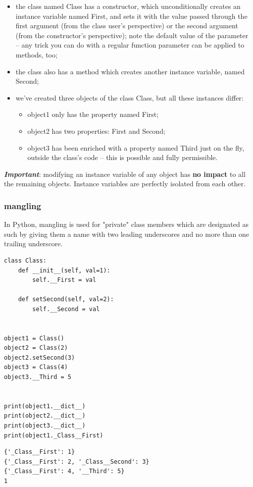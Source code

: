 \documentclass[11pt]{article}
\begin{document}
\begin{itemize}
\item the class named Class has a constructor, which unconditionally
creates an instance variable named First, and sets it with the value
passed through the first argument (from the class user’s
perspective) or the second argument (from the constructor’s
perspective); note the default value of the parameter – any trick
you can do with a regular function parameter can be applied to
methods, too;
\item the class also has a method which creates another instance variable,
named Second;
\item we’ve created three objects of the class Class, but all these
instances differ:
\begin{itemize}
\item object1 only has the property named First;
\item object2 has two properties: First and Second;
\item object3 has been enriched with a property named Third just on the
fly, outside the class’s code – this is possible and fully
permissible.
\end{itemize}
\end{itemize}

\emph{\textbf{Important}}: modifying an instance variable of any object has \textbf{no
impact} to all the remaining objects. Instance variables are perfectly
isolated from each other.

\subsubsection{mangling}
\label{sec:orga2a7794}
In Python, mangling is used for "private" class members which are
designated as such by giving them a name with two leading underscores
and no more than one trailing underscore.

\begin{verbatim}
class Class:
	def __init__(self, val=1):
		self.__First = val

	def setSecond(self, val=2):
		self.__Second = val


object1 = Class()
object2 = Class(2)
object2.setSecond(3)
object3 = Class(4)
object3.__Third = 5


print(object1.__dict__)
print(object2.__dict__)
print(object3.__dict__)
print(object1._Class__First)
\end{verbatim}

\begin{verbatim}
{'_Class__First': 1}
{'_Class__First': 2, '_Class__Second': 3}
{'_Class__First': 4, '__Third': 5}
1
\end{verbatim}
\end{document}
